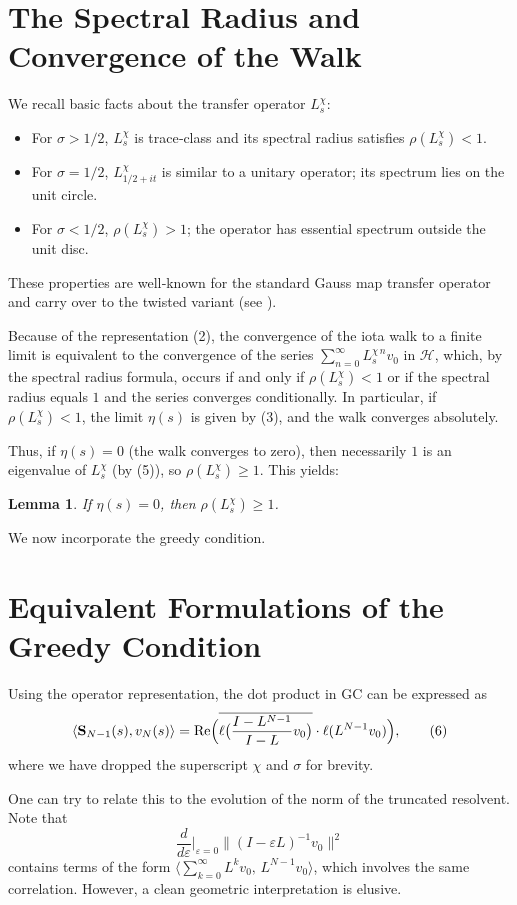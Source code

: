 \documentclass[11pt,a4paper]{article}
\newtheorem{lemma}[theorem]{Lemma}
\newcommand{\RE}{\operatorname{Re}}
\begin{document}
\section{The Spectral Radius and Convergence of the Walk}
We recall basic facts about the transfer operator $L_s^{\chi}$:
\begin{itemize}
\item For $\sigma > 1/2$, $L_s^{\chi}$ is trace‑class and its spectral radius satisfies $\rho(L_s^{\chi}) < 1$.
\item For $\sigma = 1/2$, $L_{1/2+it}^{\chi}$ is similar to a unitary operator; its spectrum lies on the unit circle.
\item For $\sigma < 1/2$, $\rho(L_s^{\chi}) > 1$; the operator has essential spectrum outside the unit disc.
\end{itemize}
These properties are well‑known for the standard Gauss map transfer operator and carry over to the twisted variant (see \cite{Mayer,Efrat}).

Because of the representation (2), the convergence of the iota walk to a finite limit is equivalent to the convergence of the series $\sum_{n=0}^{\infty} L_s^{\chi\, n} v_0$ in $\mathcal{H}$, which, by the spectral radius formula, occurs if and only if $\rho(L_s^{\chi}) < 1$ or if the spectral radius equals $1$ and the series converges conditionally.  In particular, if $\rho(L_s^{\chi}) < 1$, the limit $\eta(s)$ is given by (3), and the walk converges absolutely.

Thus, if $\eta(s) = 0$ (the walk converges to zero), then necessarily $1$ is an eigenvalue of $L_s^{\chi}$ (by (5)), so $\rho(L_s^{\chi}) \ge 1$.  This yields:
\begin{lemma}\label{lem:rho}
If $\eta(s) = 0$, then $\rho(L_s^{\chi}) \ge 1$.
\end{lemma}

We now incorporate the greedy condition.

\section{Equivalent Formulations of the Greedy Condition}
Using the operator representation, the dot product in GC can be expressed as
\[
\langle \mathbf{S}_{N-1}(s), v_N(s) \rangle
= \RE \Bigl( \overline{ \ell\bigl( \frac{I - L^{N-1}}{I - L} v_0 \bigr) } \cdot \ell( L^{N-1} v_0 ) \Bigr),
\tag{6}
\]
where we have dropped the superscript $\chi$ and $\sigma$ for brevity.

One can try to relate this to the evolution of the norm of the truncated resolvent.  Note that
\[
\frac{d}{d\varepsilon}\Big|_{\varepsilon=0} \| (I - \varepsilon L)^{-1} v_0 \|^2
\]
contains terms of the form $\langle \sum_{k=0}^{\infty} L^k v_0,\, L^{N-1} v_0 \rangle$, which involves the same correlation.  However, a clean geometric interpretation is elusive.
\end{document}
